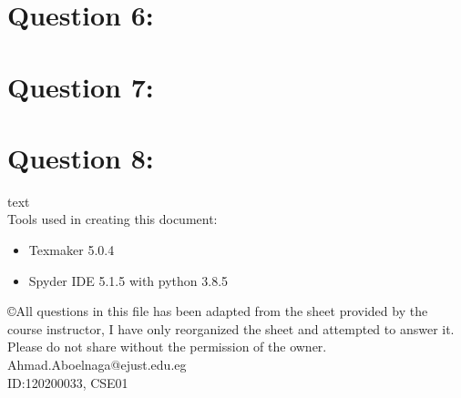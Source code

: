 \documentclass[a4paper,12pt]{article}
\begin{document}
\section*{\LARGE Question 6:}
\newpage
\section*{\LARGE Question 7:}
\newpage
\section*{\LARGE Question 8:} text\\
 Tools used in creating this document:
 \begin{itemize}
 \item Texmaker 5.0.4
 \item Spyder IDE 5.1.5 with python 3.8.5
\end{itemize}  
 
 \copyright All questions in this file has been adapted from the sheet provided by the course instructor, I have only reorganized the sheet and attempted to answer it. Please do not share without the permission of the owner.\\
\color{blue}Ahmad.Aboelnaga@ejust.edu.eg\\
ID:120200033, CSE01
 
  
\end{document}
